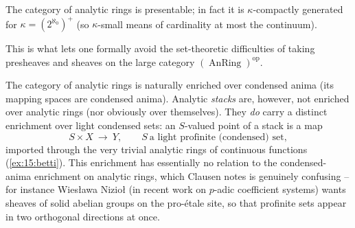 \begin{theorem}
\label{thm:15:anring-presentable}
The category of analytic rings is presentable; in fact it is $\kappa$-compactly
generated for $\kappa = (2^{\aleph_0})^+$ (so $\kappa$-small means of cardinality at
most the continuum).
\end{theorem}

This is what lets one formally avoid the set-theoretic difficulties of taking
presheaves and sheaves on the large category $(\operatorname{AnRing})^{\mathrm{op}}$.

\begin{remark}
\label{rmk:15:enrichment}
The category of analytic rings is naturally enriched over condensed anima (its mapping
spaces are condensed anima). Analytic \emph{stacks} are, however, not enriched over
analytic rings (nor obviously over themselves). They \emph{do} carry a distinct
enrichment over light condensed sets: an $S$-valued point of a stack is a map
\begin{equation*}
S\times X\ \longrightarrow\ Y,\qquad S\ \text{a light profinite (condensed) set},
\end{equation*}
imported through the very trivial analytic rings of continuous functions
(\cref{ex:15:betti}). This enrichment has essentially no relation to the condensed-anima
enrichment on analytic rings, which Clausen notes is genuinely confusing -- for
instance Wies\l awa Nizio\l{} (in recent work on $p$-adic coefficient systems) wants
sheaves of solid abelian groups on the pro-\'etale site, so that profinite sets appear
in two orthogonal directions at once.
\end{remark}
